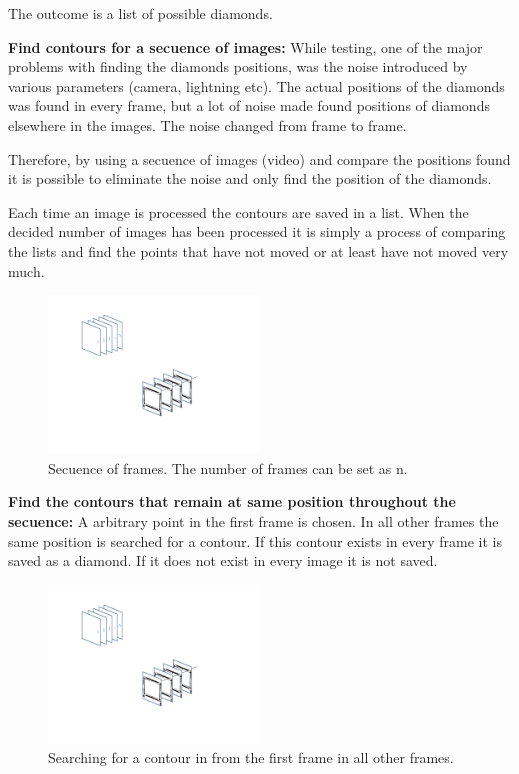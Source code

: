 The outcome is a list of possible diamonds.

\textbf{Find contours for a secuence of images:}
While testing, one of the major problems with finding the diamonds positions, was the noise introduced by various parameters (camera, lightning etc). The actual positions of the diamonds was found in every frame, but a lot of noise made found positions of diamonds elsewhere in the images. 
The noise changed from frame to frame.

Therefore, by using a secuence of images (video) and compare the positions found it is possible to eliminate the noise and only find the position of the diamonds.

Each time an image is processed the contours are saved in a list. When the decided number of images has been processed it is simply a process of comparing the lists and find the points that have not moved or at least have not moved very much.

\begin{figure}[htpb]
\begin{center}
\leavevmode
\includegraphics[width=0.5\textwidth]{images/image_seq_numbers.pdf}
\end{center}
\caption{Secuence of frames. The number of frames can be set as n.}
\label{fig:seq_img}
\end{figure}

\textbf{Find the contours that remain at same position throughout the secuence:}
A arbitrary point in the first frame is chosen. In all other frames the same position is searched for a contour. If this contour exists in every frame it is saved as a diamond. If it does not exist in every image it is not saved.

\begin{figure}[htpb]
\begin{center}
\leavevmode
\includegraphics[width=0.5\textwidth]{images/image_seq_pool.pdf}
\end{center}
\caption{Searching for a contour in from the first frame in all other frames.}
\label{fig:seq_img_pool}
\end{figure}

